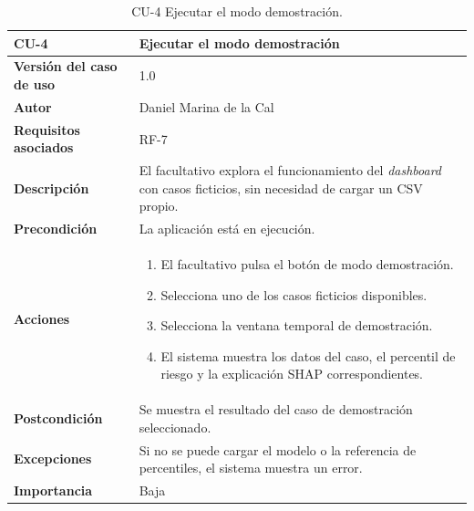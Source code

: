 \documentclass[
  spanish,
  a4paper,
  12pt,
  twoside]{memoir}
\providecommand{\tightlist}{%
  \setlength{\itemsep}{0pt}\setlength{\parskip}{0pt}}
\begin{document}
\begin{table}[p]
    \centering
    \begin{tabularx}{\linewidth}{ p{} p{} }
        \toprule
        \textbf{CU-4} & \textbf{Ejecutar el modo demostración}\\
        \toprule
        \textbf{Versión del caso de uso} & 1.0 \\
        \textbf{Autor} & Daniel Marina de la Cal \\
        \textbf{Requisitos asociados} & RF-7 \\
        \textbf{Descripción} & El facultativo explora el funcionamiento del \textit{dashboard} con casos ficticios, sin necesidad de cargar un CSV propio. \\
        \textbf{Precondición} & La aplicación está en ejecución. \\
        \textbf{Acciones} &
        \begin{enumerate}
            \def\labelenumi{\arabic{enumi}.}
            \tightlist
            \item El facultativo pulsa el botón de modo demostración.
            \item Selecciona uno de los casos ficticios disponibles.
            \item Selecciona la ventana temporal de demostración.
            \item El sistema muestra los datos del caso, el percentil de riesgo y la explicación SHAP correspondientes.
        \end{enumerate}\\
        \textbf{Postcondición} & Se muestra el resultado del caso de demostración seleccionado. \\
        \textbf{Excepciones} & Si no se puede cargar el modelo o la referencia de percentiles, el sistema muestra un error. \\
        \textbf{Importancia} & Baja \\
        \bottomrule
    \end{tabularx}
    \caption{CU-4 Ejecutar el modo demostración.}
\end{table}
\end{document}
